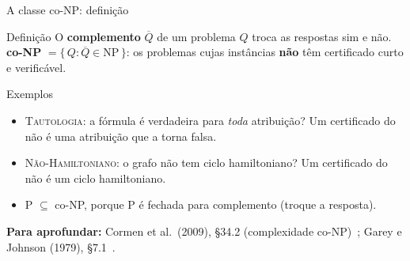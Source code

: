\documentclass[aspectratio=169,xcolor=table]{beamer}
\newcommand{\fonte}[1]{%
  \vfill
  {\tiny\color{gray!55!black}\textbf{Para aprofundar:} #1\par}%
}
\newcommand{\prob}[1]{\textsc{#1}}
\begin{document}
\begin{frame}{A classe co-NP: definição}
  \begin{block}{Definição}
    \small
    O \textbf{complemento} $\overline{Q}$ de um problema $Q$ troca as respostas sim e não.
    \textbf{co-NP} $= \{\, Q : \overline{Q} \in \mathrm{NP} \,\}$: os problemas cujas
    instâncias \textbf{não} têm certificado curto e verificável.
  \end{block}
  \begin{exampleblock}{Exemplos}
    \scriptsize
    \begin{itemize}
      \item \prob{Tautologia}: a fórmula é verdadeira para \emph{toda} atribuição? Um
            certificado do não é uma atribuição que a torna falsa.
      \item \prob{Não-Hamiltoniano}: o grafo não tem ciclo hamiltoniano? Um certificado do não
            é um ciclo hamiltoniano.
      \item P $\subseteq$ co-NP, porque P é fechada para complemento (troque a resposta).
    \end{itemize}
  \end{exampleblock}
  \fonte{Cormen et al.\ (2009), \S 34.2 (complexidade co-NP)~\cite{cormen2009introduction};
    Garey e Johnson (1979), \S 7.1~\cite{garey1979computers}.}
\end{frame}
\end{document}
